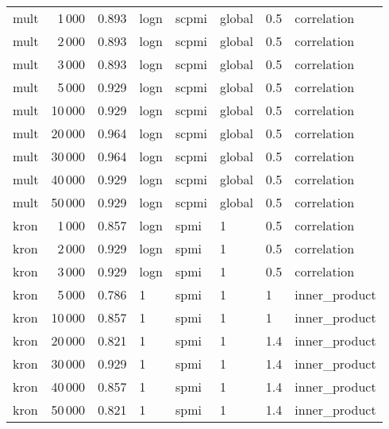 \begin{tabular}{lrrlllll}
    mult &            1\,000 &      0.893 &  logn &  scpmi &  global &  0.5 &    correlation \\
    mult &            2\,000 &      0.893 &  logn &  scpmi &  global &  0.5 &    correlation \\
    mult &            3\,000 &      0.893 &  logn &  scpmi &  global &  0.5 &    correlation \\
    mult &            5\,000 &      0.929 &  logn &  scpmi &  global &  0.5 &    correlation \\
    mult &           10\,000 &      0.929 &  logn &  scpmi &  global &  0.5 &    correlation \\
    mult &           20\,000 &      0.964 &  logn &  scpmi &  global &  0.5 &    correlation \\
    mult &           30\,000 &      0.964 &  logn &  scpmi &  global &  0.5 &    correlation \\
    mult &           40\,000 &      0.929 &  logn &  scpmi &  global &  0.5 &    correlation \\
    mult &           50\,000 &      0.929 &  logn &  scpmi &  global &  0.5 &    correlation \\
    kron &            1\,000 &      0.857 &  logn &   spmi &       1 &  0.5 &    correlation \\
    kron &            2\,000 &      0.929 &  logn &   spmi &       1 &  0.5 &    correlation \\
    kron &            3\,000 &      0.929 &  logn &   spmi &       1 &  0.5 &    correlation \\
    kron &            5\,000 &      0.786 &     1 &   spmi &       1 &    1 &  inner\_product \\
    kron &           10\,000 &      0.857 &     1 &   spmi &       1 &    1 &  inner\_product \\
    kron &           20\,000 &      0.821 &     1 &   spmi &       1 &  1.4 &  inner\_product \\
    kron &           30\,000 &      0.929 &     1 &   spmi &       1 &  1.4 &  inner\_product \\
    kron &           40\,000 &      0.857 &     1 &   spmi &       1 &  1.4 &  inner\_product \\
    kron &           50\,000 &      0.821 &     1 &   spmi &       1 &  1.4 &  inner\_product \\
\bottomrule
\end{tabular}
